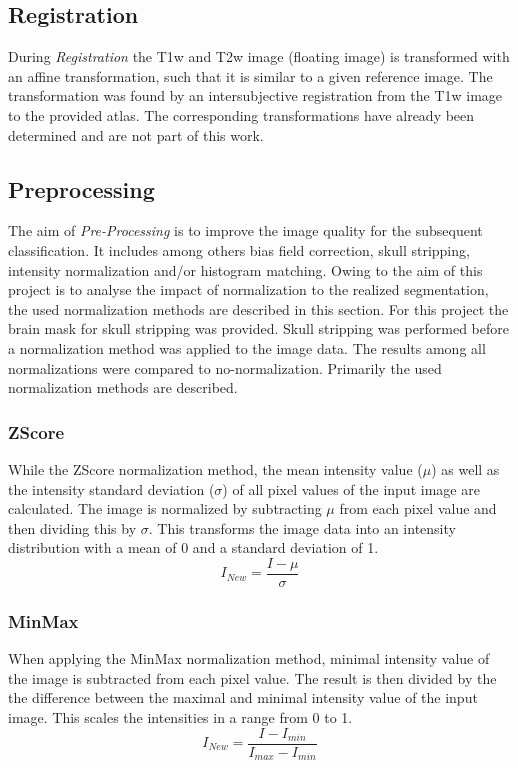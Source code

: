 \documentclass[article]{IEEEtran}
\begin{document}
\subsection{Registration}
	During {\itshape Registration} the T1w and T2w image (floating image) is transformed with an affine transformation, such that it is similar to a given reference image.
	The transformation was found by an intersubjective registration from the T1w image to the provided atlas. The corresponding transformations have already been determined
	and are not part of this work. 	
	
\subsection{Preprocessing}
	The aim of {\itshape Pre-Processing} is to improve the image quality for the subsequent classification. It includes among others bias field correction, skull stripping, intensity normalization and/or histogram matching.
	Owing to the aim of this project is to analyse the impact of normalization to the realized segmentation, the used normalization methods are described in this section.
	For this project the brain mask for skull stripping was provided. Skull stripping was performed before a normalization method was applied to the image data. The results among all normalizations were compared to no-normalization. Primarily the used normalization methods are described.\cite{reinhold2018} \smallskip
		
	\subsubsection{ZScore}
	While the ZScore normalization method, the mean intensity value ($\mu$) as well as the intensity standard deviation ($\sigma$) of all pixel values of the input image are calculated. 
	The image is normalized by subtracting $\mu$ from each pixel value and then dividing this by $\sigma$.
	This transforms the image data into an intensity distribution with a mean of 0 and a standard deviation of 1.
		\begin{equation}\label{ZScore}
			I_{New} = \frac{I - \mu}{\sigma}
		\end{equation}
			
	\subsubsection{MinMax}
	When applying the MinMax normalization method, minimal intensity value of the image is subtracted from each pixel value.
	The result is then divided by the the difference between the maximal and minimal intensity value of the input image.
	This scales the intensities in a range from 0 to 1. 
		\begin{equation}
			I_{New} = \frac{I - I_{min}}{I_{max} - I_{min}}
		\end{equation}
		
\end{document}
